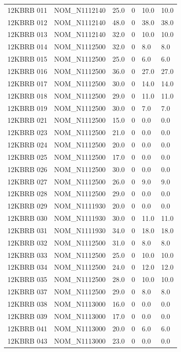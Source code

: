 \begin{table}[htbp]
\begin{tabular}{llllll}
12KBRB 011 & NOM\_N1112140 & 25.0 & 0 & 10.0 & 10.0 \\
12KBRB 012 & NOM\_N1112140 & 48.0 & 0 & 38.0 & 38.0 \\
12KBRB 013 & NOM\_N1112140 & 32.0 & 0 & 10.0 & 10.0 \\
12KBRB 014 & NOM\_N1112500 & 32.0 & 0 & 8.0 & 8.0 \\
12KBRB 015 & NOM\_N1112500 & 25.0 & 0 & 6.0 & 6.0 \\
12KBRB 016 & NOM\_N1112500 & 36.0 & 0 & 27.0 & 27.0 \\
12KBRB 017 & NOM\_N1112500 & 30.0 & 0 & 14.0 & 14.0 \\
12KBRB 018 & NOM\_N1112500 & 29.0 & 0 & 11.0 & 11.0 \\
12KBRB 019 & NOM\_N1112500 & 30.0 & 0 & 7.0 & 7.0 \\
12KBRB 021 & NOM\_N1112500 & 15.0 & 0 & 0.0 & 0.0 \\
12KBRB 023 & NOM\_N1112500 & 21.0 & 0 & 0.0 & 0.0 \\
12KBRB 024 & NOM\_N1112500 & 20.0 & 0 & 0.0 & 0.0 \\
12KBRB 025 & NOM\_N1112500 & 17.0 & 0 & 0.0 & 0.0 \\
12KBRB 026 & NOM\_N1112500 & 30.0 & 0 & 0.0 & 0.0 \\
12KBRB 027 & NOM\_N1112500 & 26.0 & 0 & 9.0 & 9.0 \\
12KBRB 028 & NOM\_N1112500 & 29.0 & 0 & 0.0 & 0.0 \\
12KBRB 029 & NOM\_N1111930 & 20.0 & 0 & 0.0 & 0.0 \\
12KBRB 030 & NOM\_N1111930 & 30.0 & 0 & 11.0 & 11.0 \\
12KBRB 031 & NOM\_N1111930 & 34.0 & 0 & 18.0 & 18.0 \\
12KBRB 032 & NOM\_N1112500 & 31.0 & 0 & 8.0 & 8.0 \\
12KBRB 033 & NOM\_N1112500 & 25.0 & 0 & 10.0 & 10.0 \\
12KBRB 034 & NOM\_N1112500 & 24.0 & 0 & 12.0 & 12.0 \\
12KBRB 035 & NOM\_N1112500 & 28.0 & 0 & 10.0 & 10.0 \\
12KBRB 037 & NOM\_N1112500 & 29.0 & 0 & 8.0 & 8.0 \\
12KBRB 038 & NOM\_N1113000 & 16.0 & 0 & 0.0 & 0.0 \\
12KBRB 039 & NOM\_N1113000 & 17.0 & 0 & 0.0 & 0.0 \\
12KBRB 041 & NOM\_N1113000 & 20.0 & 0 & 6.0 & 6.0 \\
12KBRB 043 & NOM\_N1113000 & 23.0 & 0 & 0.0 & 0.0 \\

\end{tabular}
\end{table}
